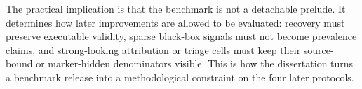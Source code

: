 The practical implication is that the benchmark is not a detachable prelude. It determines how later improvements are allowed to be evaluated: recovery must preserve executable validity, sparse black-box signals must not become prevalence claims, and strong-looking attribution or triage cells must keep their source-bound or marker-hidden denominators visible. This is how the dissertation turns a benchmark release into a methodological constraint on the four later protocols.
